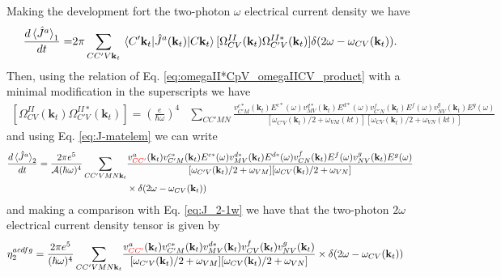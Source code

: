 \documentclass{article}
\newcommand{\kt}{\mathbf{k}_{t}}
\begin{document}
Making the development fort the two-photon $\omega$ electrical current density
we have
\begin{equation*}
\begin{split}
\frac{d \ev*{\hat{J}^{a}}_{1}}{dt} =& 2\pi \sum_{CC'V\kt} \mel*{C'\kt}
{\hat{J}^{a}(\kt)}{C\kt} [\Omega^{II}_{CV}(\kt) \Omega^{II*}_{C'V}(\kt)] 
\delta(2\omega - \omega_{CV}(\kt)) . \\
\end{split}
\end{equation*}
Then, using the relation of Eq. \eqref{eq:omegaII*CpV_omegaIICV_product} with a
minimal modification in the superscripts we have
\begin{equation}\label{eq:omegaII*CpV_omegaIICV_product-2}
\begin{split}
[\Omega^{II}_{CV}(\kt)\Omega^{II*}_{C'V}(\kt)] = \left(\frac{e}{\hbar \omega}
\right)^{4} &
\sum_{CC'MN} \frac{v^{c*}_{C'M}(\kt) E^{c*}(\omega)v^{d*}_{MV}(\kt) E^{d*}
(\omega)
v^{f}_{C'N}(\kt) E^{f}(\omega)v^{g}_{NV}(\kt) E^{g}(\omega)}
{[\omega_{C'V}(\kt)/2+\omega_{VM}(kt)][\omega_{CV}(\kt)/2+\omega_{VN}(kt)]}
\end{split}
\end{equation}
and using Eq. \eqref{eq:J-matelem} we can write
\begin{equation}
\begin{split}
\frac{d\ev*{\hat{J}^{a}}_{2}}{dt} = \frac{2 \pi e^{5}}{\mathcal{A} 
(\hbar \omega)^{4}} \sum_{CC'VMN\kt} & \frac{v^{a}_{\color{red}{CC'}}(\kt) 
v^{c*}_{C'M}(\kt)E^{c*}(\omega) v^{d*}_{MV}(\kt) E^{d*}(\omega) 
v^{f}_{CN}(\kt) E^{f}(\omega) v^{g}_{NV}(\kt) E^{g}(\omega) }
{[\omega_{C'V}(\kt)/2 + \omega_{VM}] [\omega_{CV}(\kt)/2 + \omega_{VN}]} \\
& \times \delta(2\omega - \omega_{CV}(\kt))
\end{split}
\end{equation}
and making a comparison with Eq. \eqref{eq:J_2-1w} we have that the two-photon
$2\omega$ electrical current density tensor is given by
\begin{equation}
\begin{split}
\eta^{acdfg}_{2} = \frac{2 \pi e^{5}}{(\hbar \omega)^{4}} \sum_{CC'VMN\kt} 
& \frac{v^{a}_{\color{red}{CC'}}(\kt) v^{c*}_{C'M}(\kt) v^{d*}_{MV}(\kt) v^{f}_
{CV}(\kt) v^{g}_{NV}(\kt)} {[\omega_{C'V}(\kt)/2 + \omega_{VM}] 
[\omega_{CV}(\kt)/2 + \omega_{VN}]} \times \delta(2\omega - \omega_{CV}(\kt))
\end{split}
\end{equation}
\end{document}
